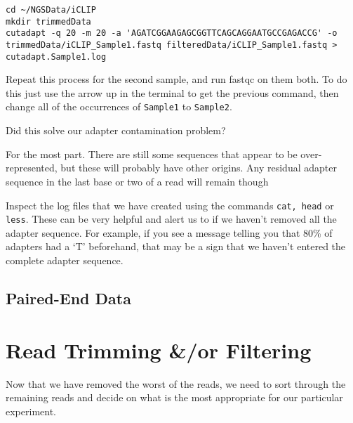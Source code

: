 \begin{steps}
\begin{minipage}{\textwidth}
\begin{lstlisting}
cd ~/NGSData/iCLIP
mkdir trimmedData
cutadapt -q 20 -m 20 -a 'AGATCGGAAGAGCGGTTCAGCAGGAATGCCGAGACCG' -o trimmedData/iCLIP_Sample1.fastq filteredData/iCLIP_Sample1.fastq > cutadapt.Sample1.log
\end{lstlisting}
\end{minipage}
Repeat this process for the second sample, and run fastqc on them both.
To do this just use the arrow up in the terminal to get the previous command, then change all of the occurrences of \texttt{Sample1} to \texttt{Sample2}.
\end{steps}

\begin{questions}
Did this solve our adapter contamination problem?\\
\begin{answer}
For the most part.
There are still some sequences that appear to be over-represented, but these will probably have other origins.
Any residual adapter sequence in the last base or two of a read will remain though
\end{answer}
\end{questions}

\begin{steps}
Inspect the log files that we have created using the commands \texttt{cat, head} or \texttt{less}.
These can be very helpful and alert us to if we haven't removed all the adapter sequence.
For example, if you see a message telling you that 80\% of adapters had a `T' beforehand, that may be a sign that we haven't entered the complete adapter sequence.
\end{steps}


\subsection{Paired-End Data}

\section{Read Trimming \&/or Filtering}
Now that we have removed the worst of the reads, we need to sort through the remaining reads and decide on what is the most appropriate for our particular experiment.


